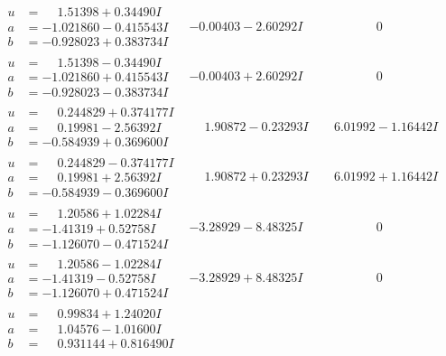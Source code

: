 \documentclass[1p]{elsarticle_modified}
\theoremstyle{definition}
\begin{document}
$$\begin{array}{c|c|c}
 \hline 
\begin{aligned}
u &= \phantom{-}1.51398 + 0.34490 I \\
a &= -1.021860 - 0.415543 I \\
b &= -0.928023 + 0.383734 I\end{aligned}
 & -0.00403 - 2.60292 I & \phantom{-0.000000 } 0 \\ \hline\begin{aligned}
u &= \phantom{-}1.51398 - 0.34490 I \\
a &= -1.021860 + 0.415543 I \\
b &= -0.928023 - 0.383734 I\end{aligned}
 & -0.00403 + 2.60292 I & \phantom{-0.000000 } 0 \\ \hline\begin{aligned}
u &= \phantom{-}0.244829 + 0.374177 I \\
a &= \phantom{-}0.19981 - 2.56392 I \\
b &= -0.584939 + 0.369600 I\end{aligned}
 & \phantom{-}1.90872 - 0.23293 I & \phantom{-}6.01992 - 1.16442 I \\ \hline\begin{aligned}
u &= \phantom{-}0.244829 - 0.374177 I \\
a &= \phantom{-}0.19981 + 2.56392 I \\
b &= -0.584939 - 0.369600 I\end{aligned}
 & \phantom{-}1.90872 + 0.23293 I & \phantom{-}6.01992 + 1.16442 I \\ \hline\begin{aligned}
u &= \phantom{-}1.20586 + 1.02284 I \\
a &= -1.41319 + 0.52758 I \\
b &= -1.126070 - 0.471524 I\end{aligned}
 & -3.28929 - 8.48325 I & \phantom{-0.000000 } 0 \\ \hline\begin{aligned}
u &= \phantom{-}1.20586 - 1.02284 I \\
a &= -1.41319 - 0.52758 I \\
b &= -1.126070 + 0.471524 I\end{aligned}
 & -3.28929 + 8.48325 I & \phantom{-0.000000 } 0 \\ \hline\begin{aligned}
u &= \phantom{-}0.99834 + 1.24020 I \\
a &= \phantom{-}1.04576 - 1.01600 I \\
b &= \phantom{-}0.931144 + 0.816490 I\end{aligned}

\end{array}$$
\end{document}
